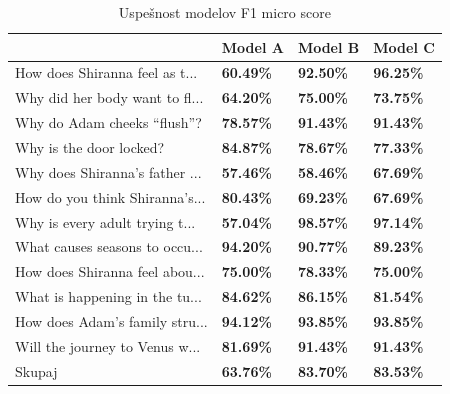 \documentclass[journal]{IEEEtran}
\begin{document}
\begin{table}[]
	\begin{tabular}{l|l|l|l|}
		\cline{2-4}
		                            & Model A          & Model B          & Model C          \\ \hline


	
	\multicolumn{1}{|l|}{How does Shiranna feel as t...} & \textbf{60.49\%} & \textbf{92.50\%} & \textbf{96.25\%} \\ \hline
	\multicolumn{1}{|l|}{Why did her body want to fl...} & \textbf{64.20\%} & \textbf{75.00\%} & \textbf{73.75\%} \\ \hline
	\multicolumn{1}{|l|}{Why do Adam cheeks “flush”?} & \textbf{78.57\%} & \textbf{91.43\%} & \textbf{91.43\%} \\ \hline
	\multicolumn{1}{|l|}{Why is the door locked?} & \textbf{84.87\%} & \textbf{78.67\%} & \textbf{77.33\%} \\ \hline
	\multicolumn{1}{|l|}{Why does Shiranna’s father ...} & \textbf{57.46\%} & \textbf{58.46\%} & \textbf{67.69\%} \\ \hline
	\multicolumn{1}{|l|}{How do you think Shiranna’s...} & \textbf{80.43\%} & \textbf{69.23\%} & \textbf{67.69\%} \\ \hline
	\multicolumn{1}{|l|}{Why is every adult trying t...} & \textbf{57.04\%} & \textbf{98.57\%} & \textbf{97.14\%} \\ \hline
	\multicolumn{1}{|l|}{What causes seasons to occu...} & \textbf{94.20\%} & \textbf{90.77\%} & \textbf{89.23\%} \\ \hline
	\multicolumn{1}{|l|}{How does Shiranna feel abou...} & \textbf{75.00\%} & \textbf{78.33\%} & \textbf{75.00\%} \\ \hline
	\multicolumn{1}{|l|}{What is happening in the tu...} & \textbf{84.62\%} & \textbf{86.15\%} & \textbf{81.54\%} \\ \hline
	\multicolumn{1}{|l|}{How does Adam’s family stru...} & \textbf{94.12\%} & \textbf{93.85\%} & \textbf{93.85\%} \\ \hline
	\multicolumn{1}{|l|}{Will the journey to Venus w...} & \textbf{81.69\%} & \textbf{91.43\%} & \textbf{91.43\%} \\ \hline
	\multicolumn{1}{|l|}{Skupaj} & \textbf{63.76\%} & \textbf{83.70\%} & \textbf{83.53\%} \\ \hline
		
		
	\end{tabular}
	\caption{Uspešnost modelov F1 micro score}
	\label{t:mod}
\end{table}
\end{document}
